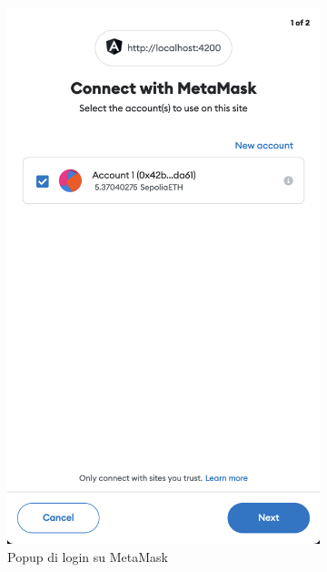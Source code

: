 \begin{figure}[t]
\begin{subfigure}{0.33\textwidth}
    \includegraphics[width=\linewidth]{src/img/login_metamask.png}
    \caption{Popup di login su MetaMask}\label{fig:login_metamask}
    \end{subfigure}
    \begin{subfigure}{0.33\textwidth}
    \centering

\end{subfigure}
\end{figure}
